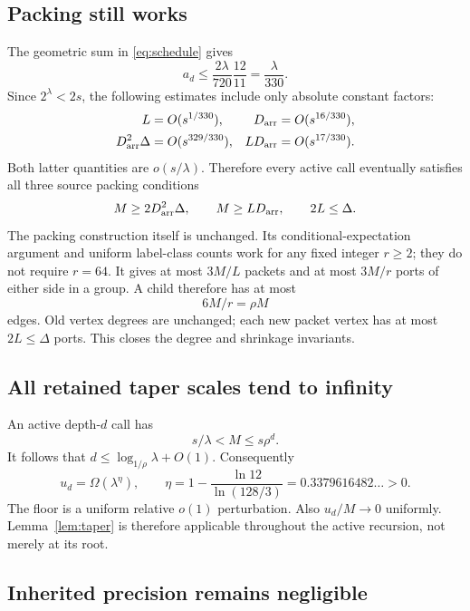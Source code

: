\documentclass[11pt]{article}
\theoremstyle{remark}
\begin{document}
\subsection{Packing still works}

The geometric sum in \eqref{eq:schedule} gives
\[
 a_d\le\frac{2\lambda}{720}\frac{12}{11}
      =\frac\lambda{330}.
\]
Since $2^\lambda<2s$, the following estimates include only absolute constant factors:
\begin{align*}
 L&=O(s^{1/330}),& D_{\rm arr}&=O(s^{16/330}),\\
 D_{\rm arr}^2\Delta&=O(s^{329/330}),&
 LD_{\rm arr}&=O(s^{17/330}).
\end{align*}
Both latter quantities are $o(s/\lambda)$. Therefore every active call eventually satisfies all three source packing conditions
\begin{equation}
 M\ge2D_{\rm arr}^2\Delta,\qquad
 M\ge LD_{\rm arr},\qquad 2L\le\Delta.
 \label{eq:packing}
\end{equation}
The packing construction itself is unchanged. Its conditional-expectation argument and uniform label-class counts work for any fixed integer $r\ge2$; they do not require $r=64$. It gives at most $3M/L$ packets and at most $3M/r$ ports of either side in a group. A child therefore has at most
\[
 6M/r=\rho M
\]
edges. Old vertex degrees are unchanged; each new packet vertex has at most $2L\le\Delta$ ports. This closes the degree and shrinkage invariants.

\subsection{All retained taper scales tend to infinity}

An active depth-$d$ call has
\[
 s/\lambda<M\le s\rho^d.
\]
It follows that $d\le\log_{1/\rho}\lambda+O(1)$. Consequently
\begin{equation}
 u_d=\Omega(\lambda^\eta),\qquad
 \eta=1-\frac{\ln12}{\ln(128/3)}
     =0.3379616482\ldots>0.\label{eq:u-min}
\end{equation}
The floor is a uniform relative $o(1)$ perturbation. Also $u_d/M\to0$ uniformly. Lemma~\ref{lem:taper} is therefore applicable throughout the active recursion, not merely at its root.

\subsection{Inherited precision remains negligible}
\end{document}
